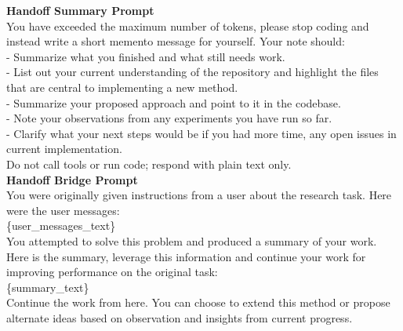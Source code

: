 \documentclass[11pt]{article}
\theoremstyle{plain}
\theoremstyle{definition}
\theoremstyle{remark}
\begin{document}
\begin{tcolorbox}[
    colback=white,
    colframe=myPastelBlue,
    title=\textbf{\textcolor{black}{Context Summarization}},
    boxrule=0.5mm,
    width=\linewidth,
    arc=2mm,
    boxsep=5pt,
    left=6pt, right=6pt, top=6pt, bottom=6pt,
]

\textbf{Handoff Summary Prompt}\\
You have exceeded the maximum number of tokens, please stop coding and instead write a short memento message for yourself. Your note should:\\

- Summarize what you finished and what still needs work.\\
- List out your current understanding of the repository and highlight the files that are central to implementing a new method.\\
- Summarize your proposed approach and point to it in the codebase.\\
- Note your observations from any experiments you have run so far.\\
- Clarify what your next steps would be if you had more time, any open issues in current implementation.\\

Do not call tools or run code; respond with plain text only.\\


\textbf{Handoff Bridge Prompt}\\
You were originally given instructions from a user about the research task. Here were the user messages:\\

\{user\_messages\_text\}\\

You attempted to solve this problem and produced a summary of your work. Here is the summary, leverage this information and continue your work for improving performance on the original task:\\

\{summary\_text\}\\

Continue the work from here. You can choose to extend this method or propose alternate ideas based on observation and insights from current progress.

\end{tcolorbox} \label{box:summarization-prompt}
\end{document}
